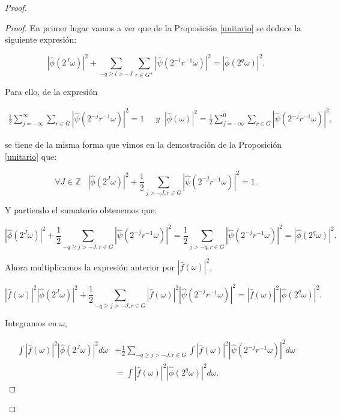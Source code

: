 \begin{proof}
\begin{proof}

  \noindent En primer lugar vamos a ver que de la Proposición \ref{unitario} se deduce la siguiente expresión: 

  $$|\widehat{\phi}(2^J \omega)|^2 + \sum_{-q\geq l > -J} \sum_{r \in G^+}|\widehat{\psi}(2^{-l}r^{-1} \omega)|^2=|\widehat{\phi}(2^q \omega) |^2.$$

  \noindent Para ello, de la expresión

  \begin{align*}
    \frac{1}{2} \sum_{j=-\infty}^\infty \sum_{r \in G} |\widehat{\psi}(2^{-j}r^{-1}\omega)|^2=1 & \; \; y
    \;\;|\widehat{\phi}(\omega)|^2= \frac{1}{2} \sum_{j=-\infty}^0 \sum_{r\in G} |\widehat{\psi}(2^{-j}r^{-1}\omega)|^2,
  \end{align*}

  \noindent se tiene de la misma forma que vimos en la demostración de la Proposición \ref{unitario} que:

  $$\forall J \in \mathbb{Z} \; \; \; \left|\widehat{\phi}\left(2^J\omega\right)\right|^2 + \frac{1}{2} \sum_{j>-J,r\in G}\left|\widehat{\psi}\left(2^{-j}r^{-1}\omega\right)\right|^2=1. $$

  \noindent Y partiendo el sumatorio obtenemos que: 

  $$\left|\widehat{\phi}\left(2^J\omega\right)\right|^2 + \frac{1}{2}  \sum_{-q \geq j >-J,r \in G}\left|\widehat{\psi}\left(2^{-j}r^{-1}\omega\right)\right|^2= \frac{1}{2} \sum_{j>-q,r \in G}\left|\widehat{\psi}\left(2^{-j}r^{-1}\omega\right)\right|^2=|\widehat{\phi}(2^q \omega)|^2.$$
  
  \noindent Ahora multiplicamos la expresión anterior por $|\widehat{f}(\omega)|^2$, 
  
  $$\left|\widehat{f}(\omega)\right|^2 \left|\widehat{\phi}\left(2^J\omega\right)\right|^2 + \frac{1}{2} \sum_{-q \geq j >-J,r \in G} \left|\widehat{f}(\omega)\right|^2 \left|\widehat{\psi}\left(2^{-j}r^{-1}\omega\right)\right|^2=\left|\widehat{f}(\omega)\right|^2 \left|\widehat{\phi}(2^q \omega)\right|^2.$$

  \noindent Integramos en $\omega$, 

  \begin{align*}
    \int \left|\widehat{f}(\omega)\right|^2 \left|\widehat{\phi}\left(2^J\omega\right)\right|^2 d\omega &+ \frac{1}{2} \sum_{-q \geq j >-J,r \in G} \int \left|\widehat{f}(\omega)\right|^2 \left|\widehat{\psi}\left(2^{-j}r^{-1}\omega\right)\right|^2 d\omega \\ 
    &=\int \left|\widehat{f}(\omega)\right|^2 \left|\widehat{\phi}(2^q \omega)\right|^2 d\omega.
  \end{align*}



\end{proof}
\end{proof}
